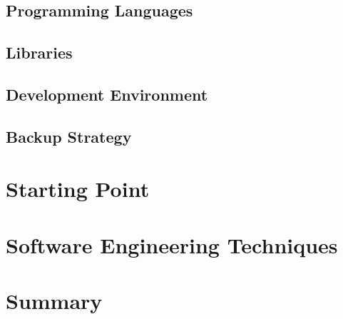     \subsection{Programming Languages}
    
    \subsection{Libraries}
    
    \subsection{Development Environment}
    
    \subsection{Backup Strategy}
    
    \section{Starting Point}
    
    \section{Software Engineering Techniques}
    
    \section{Summary}

